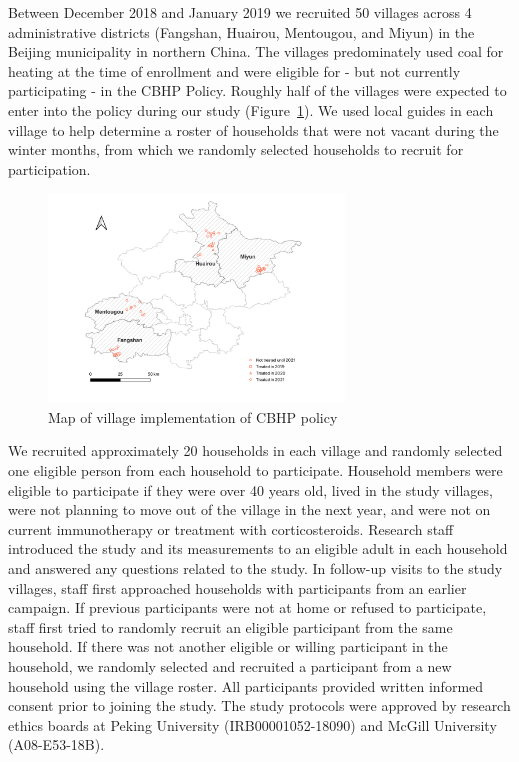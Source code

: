 \documentclass[
  letterpaper,
  DIV=11,
  numbers=noendperiod]{scrartcl}
\begin{document}
Between December 2018 and January 2019 we recruited 50 villages across 4
administrative districts (Fangshan, Huairou, Mentougou, and Miyun) in
the Beijing municipality in northern China. The villages predominately
used coal for heating at the time of enrollment and were eligible for -
but not currently participating - in the CBHP Policy. Roughly half of
the villages were expected to enter into the policy during our study
(Figure~\ref{fig-cbhp-map}). We used local guides in each village to
help determine a roster of households that were not vacant during the
winter months, from which we randomly selected households to recruit for
participation.

\begin{figure}[H]

{\centering \includegraphics[width=0.7\textwidth,height=\textheight]{images/policy-implementation-map.png}

}

\caption{\label{fig-cbhp-map}Map of village implementation of CBHP
policy}

\end{figure}

We recruited approximately 20 households in each village and randomly
selected one eligible person from each household to participate.
Household members were eligible to participate if they were over 40
years old, lived in the study villages, were not planning to move out of
the village in the next year, and were not on current immunotherapy or
treatment with corticosteroids. Research staff introduced the study and
its measurements to an eligible adult in each household and answered any
questions related to the study. In follow-up visits to the study
villages, staff first approached households with participants from an
earlier campaign. If previous participants were not at home or refused
to participate, staff first tried to randomly recruit an eligible
participant from the same household. If there was not another eligible
or willing participant in the household, we randomly selected and
recruited a participant from a new household using the village roster.
All participants provided written informed consent prior to joining the
study. The study protocols were approved by research ethics boards at
Peking University (IRB00001052-18090) and McGill University
(A08-E53-18B).
\end{document}
